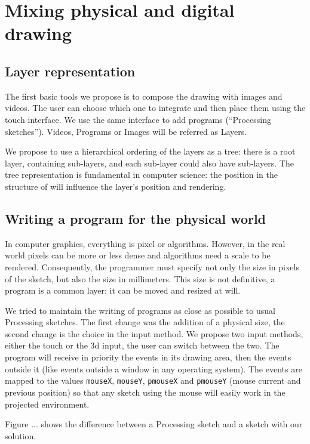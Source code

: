 \documentclass{sigchi}
\begin{document}
\section{Mixing physical and digital drawing}

\subsection{Layer representation} 

The first basic tools we propose is to compose the drawing with images
and videos. The user can choose which one to integrate and then place
them using the touch interface. 
We use the same interface to add programs (``Processing sketches''). 
Videos, Programs or Images will be referred as Layers. 

We propose to use a hierarchical ordering of the layers as a tree: 
there is a root layer, containing sub-layers, and each sub-layer could
also have sub-layers. The tree representation is fundamental in
computer science: the position in the structure of will influence the
layer's position and rendering. 

\subsection{Writing a program for the physical world}

In computer graphics, everything is pixel or algorithms. However, in
the real world pixels can be more or less dense and algorithms need a
scale to be rendered. Consequently, the programmer must specify not
only the size in pixels of the sketch, but also the size in
millimeters. This size is not definitive, a program is a common layer:
it can be moved and resized at will. 

We tried to maintain the writing of programs as close as possible to
usual Processing sketches. The first change was the addition of a
physical size, the second change is the choice in the input method. 
We propose two input methods, either the touch or the 3d input, the
user can switch between the two. The program will receive in priority
the events in its drawing area, then the events outside it (like
events outside a window in any operating system). 
The events are mapped to the values \texttt{mouseX}, \texttt{mouseY},
\texttt{pmouseX} and \texttt{pmouseY} (mouse current and previous
position) so that any sketch using the mouse will
easily work in the projected environment. 

Figure ... shows the difference between a Processing sketch and a
sketch with our solution. 
\end{document}
